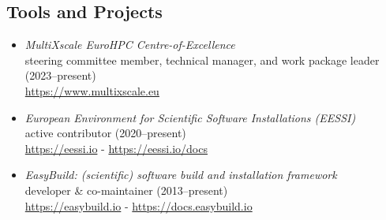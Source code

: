 \subsection*{Tools and Projects}

\begin{itemize}
    \item[] \emph{MultiXscale EuroHPC Centre-of-Excellence}
        \\steering committee member, technical manager, and work package leader (2023--present)
        \\{\small{\url{https://www.multixscale.eu}}}
    \item[] \emph{European Environment for Scientific Software Installations (EESSI)}
        \\active contributor (2020--present)
        \\{\small{\url{https://eessi.io} - \url{https://eessi.io/docs}}}
    \item[] \emph{EasyBuild: (scientific) software build and installation framework}
        \\developer \& co-maintainer (2013--present)
        \\{\small{\url{https://easybuild.io} - \url{https://docs.easybuild.io}}}
\end{itemize}

